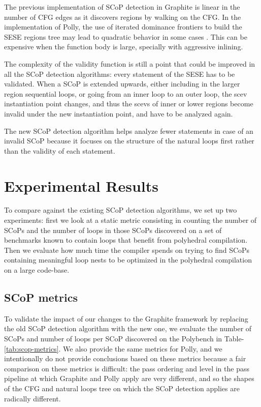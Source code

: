 \documentclass{sig-alternate}
\begin{document}
The previous implementation of SCoP detection in Graphite is linear in the
number of CFG edges as it discovers regions by walking on the CFG.  In the
implementation of Polly, the use of iterated dominance frontiers to build the
SESE regions tree may lead to quadratic behavior in some cases \cite{ramalingam}.
This can be expensive when the function body is large, specially with aggressive
inlining.

The complexity of the validity function is still a point that could be improved
in all the SCoP detection algorithms: every statement of the SESE has to be
validated.  When a SCoP is extended upwards, either including in the larger
region sequential loops, or going from an inner loop to an outer loop, the scev
instantiation point changes, and thus the scevs of inner or lower regions become
invalid under the new instantiation point, and have to be analyzed again.

The new SCoP detection algorithm helps analyze fewer statements in case of an
invalid SCoP because it focuses on the structure of the natural loops first
rather than the validity of each statement.

\section{Experimental Results}

To compare against the existing SCoP detection algorithms, we set up two
experiments: first we look at a static metric consisting in counting the number
of SCoPs and the number of loops in those SCoPs discovered on a set of
benchmarks known to contain loops that benefit from polyhedral compilation.
Then we evaluate how much time the compiler spends on trying to find SCoPs
containing meaningful loop nests to be optimized in the polyhedral compilation
on a large code-base.

\subsection{SCoP metrics}
To validate the impact of our changes to the Graphite framework by replacing the
old SCoP detection algorithm with the new one, we evaluate the number of SCoPs
and number of loops per SCoP discovered on the Polybench \cite{polybench} in
Table-\ref{tab:scop-metrics}.  We also provide the same metrics for Polly, and
we intentionally do not provide conclusions based on these metrics because a
fair comparison on these metrics is difficult: the pass ordering and level in
the pass pipeline at which Graphite and Polly apply are very different, and so
the shapes of the CFG and natural loops tree on which the SCoP detection applies
are radically different.
\end{document}
